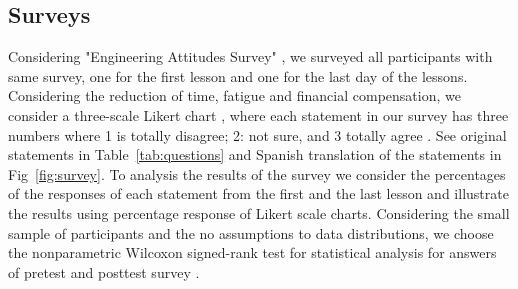 \documentclass[sigconf]{acmart}
\begin{document}
\subsection{Surveys}
Considering "Engineering Attitudes Survey" \cite{cunningham2010impact}, we surveyed all participants with same survey, one for the first lesson and one for the last day of the lessons. 
Considering the reduction of time, fatigue and financial compensation, we consider a three-scale Likert chart \cite{jebb2021}, where each statement in our survey has three numbers where 1 is totally disagree; 2: not sure, and 3 totally agree .
See original statements in Table~\ref{tab:questions} and Spanish translation of the statements in Fig~\ref{fig:survey}.
To analysis the results of the survey we consider the percentages of the responses of each statement from the first and the last lesson and illustrate the results using percentage response of Likert scale charts.
Considering the small sample of participants and the no assumptions to data distributions, we choose the nonparametric Wilcoxon signed-rank test for statistical analysis for answers of pretest and posttest survey \cite{scipy2001}.


\end{document}
